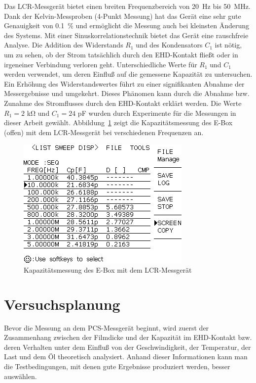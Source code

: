Das LCR-Messgerät bietet einen breiten Frequenzbereich von \SI{20}{\Hz} bis \SI{50}{\MHz}.
Dank der Kelvin-Messproben (4-Punkt Messung) hat das Gerät eine sehr gute Genauigkeit von \SI{0.1}{\percent} und ermöglicht die Messung auch bei kleinsten Änderung des Systems.
Mit einer Sinuskorrelationstechnik bietet das Gerät eine rauschfreie Analyse.
Die Addition des Widerstands $R_1$ und des Kondensators $C_1$ ist nötig, um zu sehen, ob der Strom tatsächlich durch den EHD-Kontakt fließt oder in irgeneiner Verbindung verloren geht.
Unterschiedliche Werte für $R_1$ und $C_1$ werden verwendet, um deren Einfluß auf die gemessene Kapazität zu untersuchen.
Ein Erhöhung des Widerstandswertes führt zu einer signifikanten Abnahme der Messergebnisse und umgekehrt.
Dieses Phänomen kann durch die Abnahme bzw. Zunahme des Stromflusses durch den EHD-Kontakt erklärt werden.
Die Werte $R_1 = 2$ \si{\kilo\ohm} und $C_1 = 24$ \si{\pico\farad} wurden durch Experimente für die Messungen in dieser Arbeit gewählt.
Abbildung~\ref{fig:lcr_ebox_capacitance} zeigt die Kapazitätsmessung des E-Box (offen) mit dem LCR-Messgerät bei verschiedenen Frequenzen an.

\begin{figure}[htb]
    \centering
    \includegraphics[width=0.5\linewidth]{./images/lcr_ebox_capacitance.jpg}
    \caption{Kapazitätsmessung des E-Box mit dem LCR-Messgerät}
    \label{fig:lcr_ebox_capacitance}
\end{figure}

\section{Versuchsplanung}
\label{sec:versuchsplanung}

Bevor die Messung an dem PCS-Messgerät beginnt, wird zuerst der Zusammenhang zwischen der Filmdicke und der Kapazität im EHD-Kontakt bzw. deren Verhalten unter dem Einfluß von der Geschwindigkeit, der Temperatur, der Last und dem Öl theoretisch analysiert.
Anhand dieser Informationen kann man die Testbedingungen, mit denen gute Ergebnisse produziert werden, besser auswählen.

